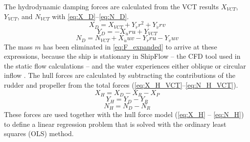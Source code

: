 The hydrodynamic damping forces are calculated from the VCT results $X_{VCT}$, $Y_{VCT}$, and $N_{VCT}$
with \autoref{eq:X_D}--\autoref{eq:N_D}.
\begin{equation}
    \label{eq:X_D}
    X_{D} = X_{VCT} + Y_{\dot{r}} r^{2} + Y_{\dot{v}} r v
\end{equation}
\begin{equation}
    \label{eq:Y_D}
    Y_{D} = - X_{\dot{u}} r u + Y_{VCT}
\end{equation}
\begin{equation}
    \label{eq:N_D}
    N_{D} = N_{VCT} + X_{\dot{u}} u v - Y_{\dot{r}} r u - Y_{\dot{v}} u v
\end{equation}
The mass $m$ has been eliminated in \autoref{eq:F_expanded} to arrive at these expressions, because the ship is stationary in ShipFlow -- the CFD tool used in the static flow calculations -- and the water experiences either oblique or circular inflow \cite{roychoudhuryCFDSimulationsSteady2017}.
The hull forces are calculated by subtracting the contributions of the rudder and propeller from the total forces (\autoref{eq:X_H_VCT}--\autoref{eq:N_H_VCT}).
\begin{equation}
    \label{eq:X_H_VCT}
    X_H = X_D - X_R - X_P
\end{equation}
\begin{equation}
    \label{eq:Y_H_VCT}
    Y_H = Y_D - Y_R
\end{equation}
\begin{equation}
    \label{eq:N_H_VCT}
    N_H = N_D - N_R
\end{equation}
These forces are used together with the hull force model (\autoref{eq:X_H} -- \autoref{eq:N_H}) to define a linear regression problem that is solved with the ordinary least squares (OLS) method. 